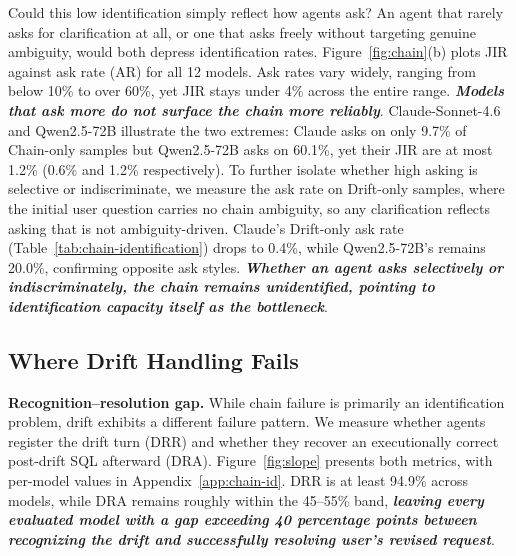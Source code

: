 Could this low identification simply reflect how agents ask? An agent that rarely asks for clarification at all, or one that asks freely without targeting genuine ambiguity, would both depress identification rates. Figure~\ref{fig:chain}(b) plots JIR against ask rate (AR) for all 12 models. Ask rates vary widely, ranging from below 10\% to over 60\%, yet JIR stays under 4\% across the entire range. \textbf{\textit{Models that ask more do not surface the chain more reliably}}. Claude-Sonnet-4.6 and Qwen2.5-72B illustrate the two extremes: Claude asks on only 9.7\% of Chain-only samples but Qwen2.5-72B asks on 60.1\%, yet their JIR are at most 1.2\% (0.6\% and 1.2\% respectively). To further isolate whether high asking is selective or indiscriminate, we measure the ask rate on Drift-only samples, where the initial user question carries no chain ambiguity, so any clarification reflects asking that is not ambiguity-driven. Claude's Drift-only ask rate (Table~\ref{tab:chain-identification}) drops to 0.4\%, while Qwen2.5-72B's remains 20.0\%, confirming opposite ask styles. \textbf{\textit{Whether an agent asks selectively or indiscriminately, the chain remains unidentified, pointing to identification capacity itself as the bottleneck}}.

\subsection{Where Drift Handling Fails}
\label{subsec:drift-bottleneck}

\noindent\textbf{Recognition--resolution gap.}
While chain failure is primarily an identification problem, drift exhibits a different failure pattern. We measure whether agents register the drift turn (DRR) and whether they recover an executionally correct post-drift SQL afterward (DRA). Figure~\ref{fig:slope} presents both metrics, with per-model values in Appendix~\ref{app:chain-id}. DRR is at least 94.9\% across models, while DRA remains roughly within the 45--55\% band, \textbf{\textit{leaving every evaluated model with a gap exceeding 40 percentage points between recognizing the drift and successfully resolving user's revised request}}.


